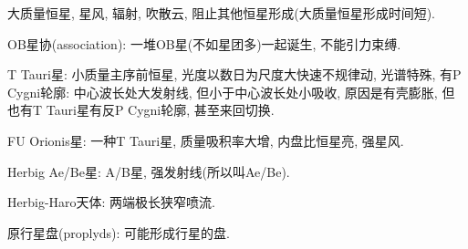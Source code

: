 大质量恒星, 星风, 辐射, 吹散云, 阻止其他恒星形成(大质量恒星形成时间短).

OB星协(association): 一堆OB星(不如星团多)一起诞生, 不能引力束缚.

T Tauri星: 小质量主序前恒星, 光度以数日为尺度大快速不规律动, 光谱特殊, 有P Cygni轮廓: 中心波长处大发射线, 但小于中心波长处小吸收, 原因是有壳膨胀, 但也有T Tauri星有反P Cygni轮廓, 甚至来回切换.

FU Orionis星: 一种T Tauri星, 质量吸积率大增, 内盘比恒星亮, 强星风.

Herbig Ae/Be星: A/B星, 强发射线(所以叫Ae/Be).

Herbig-Haro天体: 两端极长狭窄喷流. 

原行星盘(proplyds): 可能形成行星的盘.
